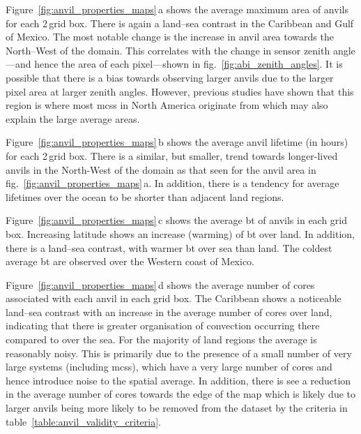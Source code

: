 Figure~\ref{fig:anvil_properties_maps}\,a shows the average maximum area of anvils for each 2\,\textdegree grid box.
There is again a land--sea contrast in the Caribbean and Gulf of Mexico.
The most notable change is the increase in anvil area towards the North--West of the domain.
This correlates with the change in sensor zenith angle---and hence the area of each pixel---shown in fig.~\ref{fig:abi_zenith_angles}.
It is possible that there is a bias towards observing larger anvils due to the larger pixel area at larger zenith angles.
However, previous studies have shown that this region is where most \acrshort{mcs}s in North America originate from \citep{feng_spatiotemporal_2019} which may also explain the large average areas.

Figure~\ref{fig:anvil_properties_maps}\,b shows the average anvil lifetime (in hours) for each 2\,\textdegree grid box.
There is a similar, but smaller, trend towards longer-lived anvils in the North-West of the domain as that seen for the anvil area in fig.~\ref{fig:anvil_properties_maps}\,a.
In addition, there is a tendency for average lifetimes over the ocean to be shorter than adjacent land regions.

Figure~\ref{fig:anvil_properties_maps}\,c shows the average \acrshort{bt} of anvils in each grid box.
Increasing latitude shows an increase (warming) of \acrshort{bt} over land.
In addition, there is a land--sea contrast, with warmer \acrshort{bt} over sea than land.
The coldest average \acrshort{bt} are observed over the Western coast of Mexico.

Figure~\ref{fig:anvil_properties_maps}\,d shows the average number of cores associated with each anvil in each grid box.
The Caribbean shows a noticeable land--sea contrast with an increase in the average number of cores over land, indicating that there is greater organisation of convection occurring there compared to over the sea.
For the majority of land regions the average is reasonably noisy.
This is primarily due to the presence of a small number of very large systems (including \acrshort{mcs}s), which have a very large number of cores and hence introduce noise to the spatial average.
In addition, there is see a reduction in the average number of cores towards the edge of the map which is likely due to larger anvils being more likely to be removed from the dataset by the criteria in table~\ref{table:anvil_validity_criteria}.

